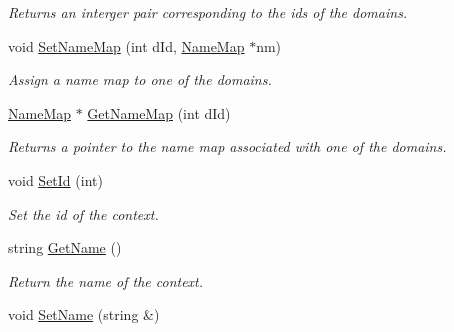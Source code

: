 \begin{DoxyCompactItemize}
\begin{DoxyCompactList}\small\item\em Returns an interger pair corresponding to the ids of the domains. \item\end{DoxyCompactList}\item 
void \hyperlink{class_context_afb2aabeb42abb6e561a9ea898520baef}{SetNameMap} (int dId, \hyperlink{class_name_map}{NameMap} $\ast$nm)
\begin{DoxyCompactList}\small\item\em Assign a name map to one of the domains. \item\end{DoxyCompactList}\item 
\hyperlink{class_name_map}{NameMap} $\ast$ \hyperlink{class_context_af00dbb1f5b5fa02eea8e2e326e297bb9}{GetNameMap} (int dId)
\begin{DoxyCompactList}\small\item\em Returns a pointer to the name map associated with one of the domains. \item\end{DoxyCompactList}\item 
\hypertarget{class_context_ae0f9d4005435ecb3c5f01002eec2f15e}{
void \hyperlink{class_context_ae0f9d4005435ecb3c5f01002eec2f15e}{SetId} (int)}
\label{class_context_ae0f9d4005435ecb3c5f01002eec2f15e}

\begin{DoxyCompactList}\small\item\em Set the id of the context. \item\end{DoxyCompactList}\item 
\hypertarget{class_context_af745b4bd53e87f9413288378b9dba2ba}{
string \hyperlink{class_context_af745b4bd53e87f9413288378b9dba2ba}{GetName} ()}
\label{class_context_af745b4bd53e87f9413288378b9dba2ba}

\begin{DoxyCompactList}\small\item\em Return the name of the context. \item\end{DoxyCompactList}\item 
\hypertarget{class_context_a8d86d8eaafc65601e65b0b77a691071b}{
void \hyperlink{class_context_a8d86d8eaafc65601e65b0b77a691071b}{SetName} (string \&)}
\label{class_context_a8d86d8eaafc65601e65b0b77a691071b}


\end{DoxyCompactItemize}
